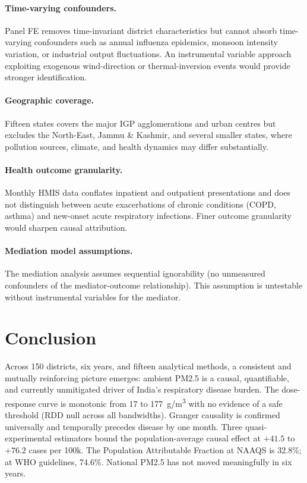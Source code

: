 \documentclass{article}
\begin{document}
\paragraph{Time-varying confounders.}
Panel FE removes time-invariant district characteristics but cannot absorb time-varying
confounders such as annual influenza epidemics, monsoon intensity variation, or industrial
output fluctuations. An instrumental variable approach exploiting exogenous wind-direction
or thermal-inversion events would provide stronger identification.

\paragraph{Geographic coverage.}
Fifteen states covers the major IGP agglomerations and urban centres but excludes the
North-East, Jammu \& Kashmir, and several smaller states, where pollution sources, climate,
and health dynamics may differ substantially.

\paragraph{Health outcome granularity.}
Monthly HMIS data conflates inpatient and outpatient presentations and does not distinguish
between acute exacerbations of chronic conditions (COPD, asthma) and new-onset acute
respiratory infections. Finer outcome granularity would sharpen causal attribution.

\paragraph{Mediation model assumptions.}
The mediation analysis assumes sequential ignorability (no unmeasured confounders of the
mediator-outcome relationship). This assumption is untestable without instrumental
variables for the mediator.

\section{Conclusion}
\label{sec:conclusion}

Across 150 districts, six years, and fifteen analytical methods, a consistent and
mutually reinforcing picture emerges: ambient PM2.5 is a causal, quantifiable, and
currently unmitigated driver of India's respiratory disease burden. The dose-response
curve is monotonic from 17 to 177~\textmu{}g/m\textsuperscript{3} with no evidence
of a safe threshold (RDD null across all bandwidths). Granger causality is confirmed
universally and temporally precedes disease by one month. Three quasi-experimental
estimators bound the population-average causal effect at $+41.5$ to $+76.2$ cases
per 100k. The Population Attributable Fraction at NAAQS is 32.8\%; at WHO guidelines,
74.6\%. National PM2.5 has not moved meaningfully in six years.
\end{document}
